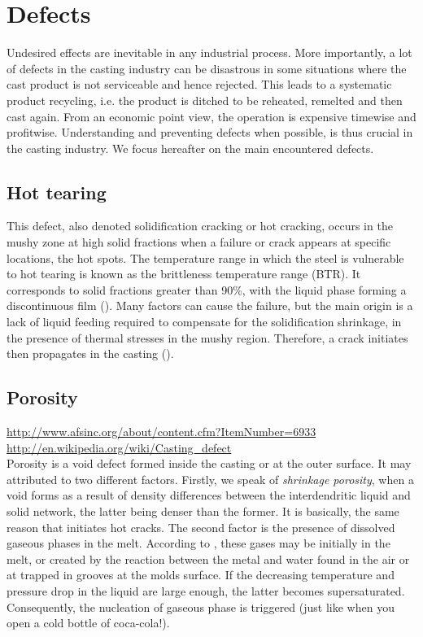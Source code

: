 \section*{Defects}
Undesired effects are inevitable in any industrial process. More importantly, a lot of defects in the casting industry can be disastrous in some situations where the cast product is not serviceable and hence rejected. This leads to a systematic product recycling, i.e. the product is ditched to be reheated, remelted and then cast again. From an economic point view, the operation is expensive timewise and profitwise. Understanding and preventing defects when possible, is thus crucial in the casting industry.
We focus hereafter on the main encountered defects.

\subsection*{Hot tearing}
This defect, also denoted solidification cracking or hot cracking, occurs in the mushy zone at high solid fractions when a failure
or crack appears at specific locations, the hot spots. The temperature range in which the steel is vulnerable to hot tearing is known as the brittleness temperature range (BTR). It corresponds to solid fractions greater than \num{90}\%, with the liquid phase forming a discontinuous film (). Many factors can cause the failure, but the main origin is a lack of liquid feeding required to compensate for the solidification shrinkage, in the presence of thermal stresses in the mushy region. Therefore, a crack initiates then propagates in the casting (). 

\subsection*{Porosity}
\url{http://www.afsinc.org/about/content.cfm?ItemNumber=6933} \\
\url{http://en.wikipedia.org/wiki/Casting_defect} \\
Porosity is a void defect formed inside the casting or at the outer surface. It may attributed to two different factors.
Firstly, we speak of \emph{shrinkage porosity}, when a void forms as a result of density differences between the interdendritic liquid and solid
network, the latter being denser than the former. It is basically, the same reason that initiates hot cracks. 
The second factor is the presence of dissolved gaseous phases in the melt. According to \citet{dantzig_solidification_2009}, these gases may be initially in the melt, or created by the reaction between the metal and water found in the air or at trapped in grooves at the molds surface. If the decreasing temperature and pressure drop in the liquid are large enough, the latter becomes supersaturated. Consequently, the nucleation of gaseous phase is triggered (just like when you open a cold bottle of coca-cola!).

